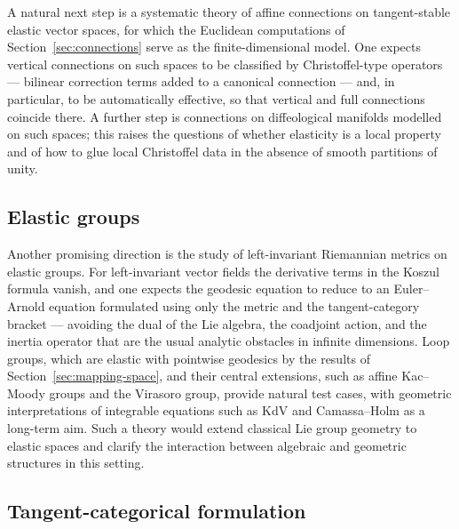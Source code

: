 \documentclass{amsart}
\theoremstyle{definition}
\begin{document}
A natural next step is a systematic theory of affine connections on
tangent-stable elastic vector spaces, for which the Euclidean computations
of Section~\ref{sec:connections} serve as the finite-dimensional model. One
expects vertical connections on such spaces to be classified by
Christoffel-type operators --- bilinear correction terms added to a
canonical connection --- and, in particular, to be automatically effective,
so that vertical and full connections coincide there. A further step is
connections on diffeological manifolds modelled on such spaces; this raises
the questions of whether elasticity is a local property and of how to glue
local Christoffel data in the absence of smooth partitions of unity.

\subsection{Elastic groups}\label{subsec:elastic-group}

Another promising direction is the study of left-invariant Riemannian
metrics on elastic groups. For left-invariant vector fields the derivative
terms in the Koszul formula vanish, and one expects the geodesic equation
to reduce to an Euler--Arnold equation formulated using only the metric and
the tangent-category bracket --- avoiding the dual of the Lie algebra, the
coadjoint action, and the inertia operator that are the usual analytic
obstacles in infinite dimensions. Loop groups, which are elastic with
pointwise geodesics by the results of Section~\ref{sec:mapping-space}, and
their central extensions, such as affine Kac--Moody groups and the Virasoro
group, provide natural test cases, with geometric interpretations of
integrable equations such as KdV and Camassa--Holm as a long-term aim. Such
a theory would extend classical Lie group geometry to elastic spaces and
clarify the interaction between algebraic and geometric structures in this
setting.

\subsection{Tangent-categorical formulation}\label{subsec:tangent-core}
\end{document}
